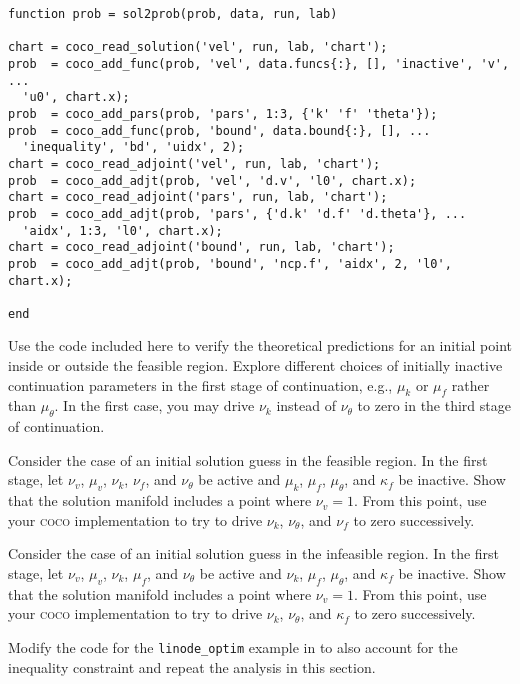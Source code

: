 \begin{lstlisting}[language=coco-highlight]
function prob = sol2prob(prob, data, run, lab)

chart = coco_read_solution('vel', run, lab, 'chart');
prob  = coco_add_func(prob, 'vel', data.funcs{:}, [], 'inactive', 'v', ...
  'u0', chart.x);
prob  = coco_add_pars(prob, 'pars', 1:3, {'k' 'f' 'theta'});
prob  = coco_add_func(prob, 'bound', data.bound{:}, [], ...
  'inequality', 'bd', 'uidx', 2);
chart = coco_read_adjoint('vel', run, lab, 'chart');
prob  = coco_add_adjt(prob, 'vel', 'd.v', 'l0', chart.x);
chart = coco_read_adjoint('pars', run, lab, 'chart');
prob  = coco_add_adjt(prob, 'pars', {'d.k' 'd.f' 'd.theta'}, ...
  'aidx', 1:3, 'l0', chart.x);
chart = coco_read_adjoint('bound', run, lab, 'chart');
prob  = coco_add_adjt(prob, 'bound', 'ncp.f', 'aidx', 2, 'l0', chart.x);

end
\end{lstlisting}

\begin{exercises}
\item Use the code included here to verify the theoretical predictions for an initial point inside or outside the feasible region. Explore different choices of initially inactive continuation parameters in the first stage of continuation, e.g., $\mu_k$ or $\mu_f$ rather than $\mu_\theta$. In the first case, you may drive $\nu_k$ instead of $\nu_\theta$ to zero  in the third stage of continuation.
\item Consider the case of an initial solution guess in the feasible region. In the first stage, let $\nu_v$, $\mu_v$, $\nu_k$, $\nu_f$, and $\nu_\theta$ be active and $\mu_k$, $\mu_f$, $\mu_\theta$, and $\kappa_f$ be inactive. Show that the solution manifold includes a point where $\nu_v=1$. From this point, use your \textsc{coco} implementation to try to drive $\nu_k$, $\nu_\theta$, and $\nu_f$ to zero successively.
\item Consider the case of an initial solution guess in the infeasible region. In the first stage, let $\nu_v$, $\mu_v$, $\nu_k$, $\mu_f$, and $\nu_\theta$ be active and $\nu_k$, $\mu_f$, $\mu_\theta$, and $\kappa_f$ be inactive. Show that the solution manifold includes a point where $\nu_v=1$. From this point, use your \textsc{coco} implementation to try to drive $\nu_k$, $\nu_\theta$, and $\kappa_f$ to zero successively.
\item Modify the code for the \texttt{linode\_optim} example in  to also account for the inequality constraint and repeat the analysis in this section.
\end{exercises}



